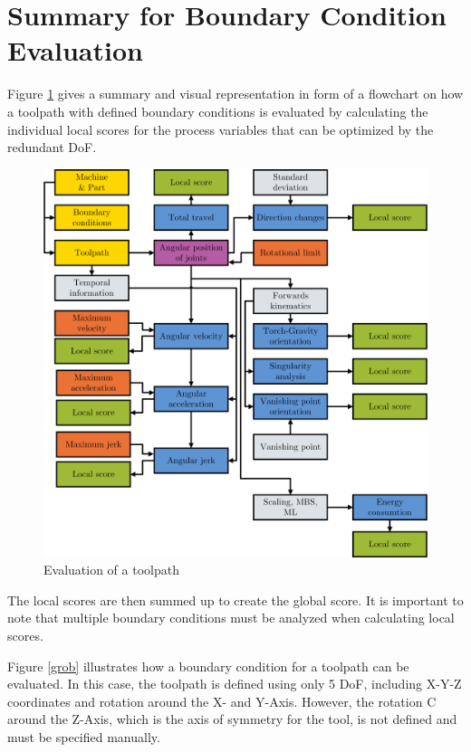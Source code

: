 \section{Summary for Boundary Condition Evaluation}



Figure \ref{allflow} gives a summary and visual representation in form of a flowchart on how a toolpath with defined boundary conditions is evaluated by calculating the individual local scores for the process variables that can be optimized by the redundant \acrshort{DoF}.

\begin{figure}[H]
	\centerline{\includegraphics[width=1\textwidth]{figures/flowchart.png}}
	\caption{Evaluation of a toolpath}
	\label{allflow}
\end{figure}


The local scores are then summed up to create the global score. It is important to note that multiple boundary conditions must be analyzed when calculating local scores.

Figure \ref{grob} illustrates how a boundary condition for a toolpath can be evaluated. In this case, the toolpath is defined using only 5 DoF, including X-Y-Z coordinates and rotation around the X- and Y-Axis. However, the rotation C around the Z-Axis, which is the axis of symmetry for the tool, is not defined and must be specified manually.


